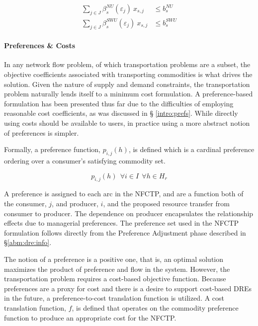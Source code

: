 \begin{align}
\label{eqs:enr-prod-constr}
\sum_{j \in J}\beta_{s}^{NU}(\varepsilon_{j}) \: x_{s,j}  & \leq b_{s}^{NU} \\
\label{eqs:enr-swu-constr}
\sum_{j \in J}\beta_{s}^{SWU}(\varepsilon_{j}) \: x_{s,j} & \leq b_{s}^{SWU}
\end{align}

\paragraph{Preferences \& Costs}

In any network flow problem, of which transportation problems are a subset, the
objective coefficients associated with transporting commodities is what drives
the solution. Given the nature of supply and demand constraints, the
transportation problem naturally lends itself to a minimum cost formulation. A
preference-based formulation has been presented thus far due to the difficulties
of employing reasonable cost coefficients, as was discussed in \S
\ref{intro:prefs}. While directly using costs should be available to users, in
practice using a more abstract notion of preferences is simpler.

Formally, a preference function, $p_{i, j}(h)$, is defined which is a cardinal
preference ordering over a consumer's satisfying commodity set.
 
\begin{equation}
p_{i, j}(h) \:\: \forall i \in I  \:\: \forall h \in H_{r} 
\end{equation}

\noindent
A preference is assigned to each arc in the NFCTP, and are a function both of
the consumer, $j$, and producer, $i$, and the proposed resource transfer from
consumer to producer. The dependence on producer encapsulates the relationship
effects due to managerial preferences. The preference set used in the NFCTP
formulation follows directly from the Preference Adjustment phase described in
\S \ref{abm:dre:info}.

The notion of a preference is a positive one, that is, an optimal solution
maximizes the product of preference and flow in the system. However, the
transportation problem requires a cost-based objective function. Because
preferences are a proxy for cost and there is a desire to support cost-based
DREs in the future, a preference-to-cost translation function is utilized. A
cost translation function, $f$, is defined that operates on the commodity
preference function to produce an appropriate cost for the NFCTP.

